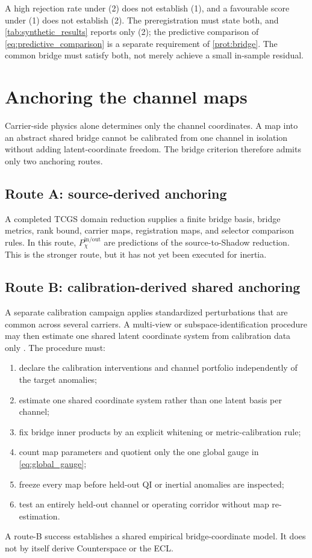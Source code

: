 \documentclass[11pt]{article}
\begin{document}
A high rejection rate under (2) does not establish (1), and a favourable score under (1) does not establish (2). The preregistration must state both, and \cref{tab:synthetic_results} reports only (2); the predictive comparison of \cref{eq:predictive_comparison} is a separate requirement of \cref{prot:bridge}. The common bridge must satisfy both, not merely achieve a small in-sample residual.

\section{Anchoring the channel maps}
\label{sec:anchoring}

Carrier-side physics alone determines only the channel coordinates. A map into an abstract shared bridge cannot be calibrated from one channel in isolation without adding latent-coordinate freedom. The bridge criterion therefore admits only two anchoring routes.

\subsection{Route A: source-derived anchoring}

A completed TCGS domain reduction supplies a finite bridge basis, bridge metrics, rank bound, carrier maps, registration maps, and selector comparison rules. In this route, \(P_{\chi}^{\mathrm{in/out}}\) are predictions of the source-to-Shadow reduction. This is the stronger route, but it has not yet been executed for inertia.

\subsection{Route B: calibration-derived shared anchoring}

A separate calibration campaign applies standardized perturbations that are common across several carriers. A multi-view or subspace-identification procedure may then estimate one shared latent coordinate system from calibration data only \cite{Ljung1999,VanOverscheeDeMoor1996}. The procedure must:
\begin{enumerate}[leftmargin=1.55em]
\item declare the calibration interventions and channel portfolio independently of the target anomalies;
\item estimate one shared coordinate system rather than one latent basis per channel;
\item fix bridge inner products by an explicit whitening or metric-calibration rule;
\item count map parameters and quotient only the one global gauge in \cref{eq:global_gauge};
\item freeze every map before held-out QI or inertial anomalies are inspected;
\item test an entirely held-out channel or operating corridor without map re-estimation.
\end{enumerate}
A route-B success establishes a shared empirical bridge-coordinate model. It does not by itself derive Counterspace or the ECL.
\end{document}
